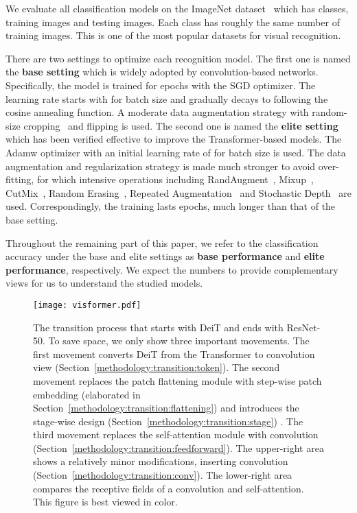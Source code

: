 \documentclass[10pt,twocolumn,letterpaper]{article}
\begin{document}
We evaluate all classification models on the ImageNet dataset~\cite{russakovsky2015imagenet} which has  classes,  training images and  testing images. Each class has roughly the same number of training images. This is one of the most popular datasets for visual recognition.

There are two settings to optimize each recognition model. The first one is named the \textbf{base setting} which is widely adopted by convolution-based networks. Specifically, the model is trained for  epochs with the SGD optimizer. The learning rate starts with  for batch size  and gradually decays to  following the cosine annealing function. A moderate data augmentation strategy with random-size cropping~\cite{szegedy2016rethinking} and flipping is used. The second one is named the \textbf{elite setting} which has been verified effective to improve the Transformer-based models. The Adamw optimizer with an initial learning rate of  for batch size  is used. The data augmentation and regularization strategy is made much stronger to avoid over-fitting, for which intensive operations including RandAugment~\cite{cubuk2020randaugment}, Mixup~\cite{Zhang2017mixup}, CutMix~\cite{yun2019cutmix}, Random Erasing~\cite{zhong2020random}, Repeated Augmentation~\cite{berman2019multigrain,hoffer2020augment} and Stochastic Depth~\cite{huang2016deep} are used. Correspondingly, the training lasts  epochs, much longer than that of the base setting. 

Throughout the remaining part of this paper, we refer to the classification accuracy under the base and elite settings as \textbf{base performance} and \textbf{elite performance}, respectively. We expect the numbers to provide complementary views for us to understand the studied models.

\begin{figure*}[t]
\begin{center}
\texttt{[image: visformer.pdf]}
\end{center}
\caption{The transition process that starts with DeiT and ends with ResNet-50. To save space, we only show three important movements. The first movement converts DeiT from the Transformer to convolution view (Section~\ref{methodology:transition:token}). The second movement replaces the patch flattening module with step-wise patch embedding (elaborated in Section~\ref{methodology:transition:flattening}) and introduces the stage-wise design (Section~\ref{methodology:transition:stage}) . The third movement replaces the self-attention module with convolution (Section~\ref{methodology:transition:feedforward}).
The upper-right area shows a relatively minor modifications, inserting  convolution (Section~\ref{methodology:transition:conv}). The lower-right area compares the receptive fields of a  convolution and self-attention. This figure is best viewed in color.}
\label{fig:transition}
\end{figure*}
\end{document}
